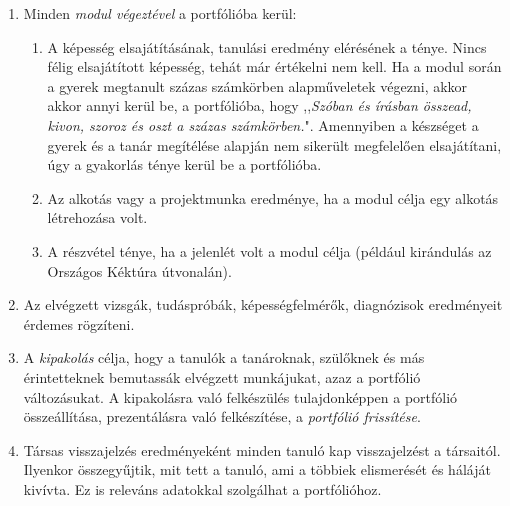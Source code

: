 \begin{enumerate}
      \item Minden \emph{modul végeztével} a portfólióba kerül:

            \begin{enumerate}

                  \item  A képesség elsajátításának, tanulási eredmény
                        elérésének a ténye.
                        Nincs
                        félig elsajátított képesség, tehát már értékelni nem
                        kell. Ha a modul során a gyerek megtanult százas
                        számkörben alapműveletek
                        végezni, akkor
                        akkor
                        annyi kerül be, a portfólióba, hogy ,,\emph{Szóban és
                              írásban
                              összead, kivon, szoroz és oszt a százas
                              számkörben.}". Amennyiben a
                        készséget a
                        gyerek és a
                        tanár megítélése alapján nem sikerült megfelelően
                        elsajátítani,
                        úgy a gyakorlás
                        ténye kerül be a portfólióba.
                  \item Az alkotás vagy a projektmunka eredménye, ha a modul
                        célja egy
                        alkotás
                        létrehozása volt.
                  \item A részvétel ténye, ha a jelenlét volt a modul célja
                        (például
                        kirándulás
                        az Országos Kéktúra útvonalán).

            \end{enumerate}
      \item Az elvégzett vizsgák, tudáspróbák, képességfelmérők, diagnózisok
            eredményeit érdemes rögzíteni.

      \item A \emph{kipakolás} célja, hogy a tanulók a tanároknak, szülőknek
            és
            más érintetteknek bemutassák elvégzett
            munkájukat, azaz
            a portfólió változásukat. A kipakolásra való felkészülés
            tulajdonképpen
            a
            portfólió összeállítása, prezentálásra való felkészítése, a
            \emph{portfólió
                  frissítése}.

      \item Társas visszajelzés eredményeként minden tanuló kap visszajelzést a
            társaitól. Ilyenkor összegyűjtik, mit tett a tanuló, ami a többiek
            elismerését
            és háláját kivívta. Ez is releváns adatokkal szolgálhat a
            portfólióhoz.


\end{enumerate}
